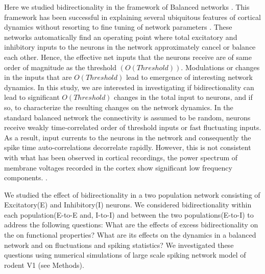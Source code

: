 Here we studied bidirectionality in the framework of Balanced networks \cite{carl1996, carl1998, carl2004}. This framework has been successful in explaining several ubiquitous features of cortical dynamics without resorting to fine tuning of network parameters \cite{softky1993, Holt1996, roxin2011}. These networks automatically find an operating point where total excitatory and inhibitory inputs to the neurons in the network approximately cancel or balance each other.  Hence, the effective net inputs that the neurons receive are of same order of magnitude as the threshold $\left( O(Threshold) \right)$. Modulations or changes in the inputs that are $O(Threshold)$ lead to emergence of interesting network dynamics. In this study, we are interested in investigating if bidirectionality can lead to significant $O(Threshold)$ changes in the total input to neurons, and if so, to characterize the resulting changes on the network dynamics. In the standard balanced network the connectivity is assumed to be random, neurons receive weakly time-correlated order of threshold inputs or fast fluctuating inputs. As a result, input currents to the neurons in the network and consequently the spike time auto-correlations decorrelate rapidly\cite{carl1996, carl1998}. However, this is not consistent with what has been observed in cortical recordings, the power spectrum of membrane voltages recorded in the cortex show significant low frequency components. \cite{Tan2014}.	
	
We studied the effect of bidirectionality in a two population network consisting of Excitatory(E) and Inhibitory(I) neurons. We considered bidirectionality within each population(E-to-E and, I-to-I) and between the two populations(E-to-I) to address the following questions: What are the effects of excess bidirectionality on the on functional properties? What are its effects on the dynamics in a balanced network and on fluctuations and spiking statistics? We investigated these questions using numerical simulations of large scale spiking network  model of rodent V1 (see Methods). \\
